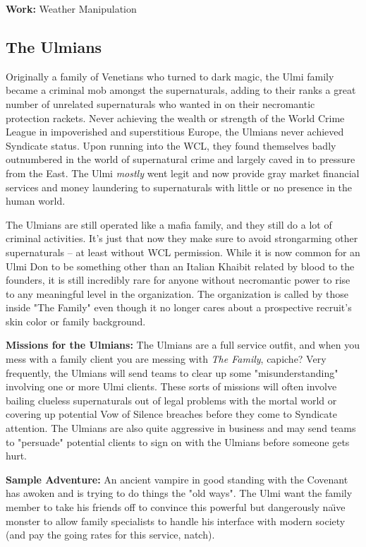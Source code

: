 \textbf{Work:} Weather Manipulation

\subsection{The Ulmians} 

Originally a family of Venetians who turned to dark magic, the Ulmi family became a criminal mob amongst the supernaturals, adding to their ranks a great number of unrelated supernaturals who wanted in on their necromantic protection rackets. Never achieving the wealth or strength of the World Crime League in impoverished and superstitious Europe, the Ulmians never achieved Syndicate status. Upon running into the WCL, they found themselves badly outnumbered in the world of supernatural crime and largely caved in to pressure from the East. The Ulmi \textit{mostly} went legit and now provide gray market financial services and money laundering to supernaturals with little or no presence in the human world.

The Ulmians are still operated like a mafia family, and they still do a lot of criminal activities. It's just that now they make sure to avoid strongarming other supernaturals -- at least without WCL permission. While it is now common for an Ulmi Don to be something other than an Italian Khaibit related by blood to the founders, it is still incredibly rare for anyone without necromantic power to rise to any meaningful level in the organization. The organization is called by those inside "The Family" even though it no longer cares about a prospective recruit's skin color or family background.

\textbf{Missions for the Ulmians:} The Ulmians are a full service outfit, and when you mess with a family client you are messing with \textit{The Family}, capiche? Very frequently, the Ulmians will send teams to clear up some "misunderstanding" involving one or more Ulmi clients. These sorts of missions will often involve bailing clueless supernaturals out of legal problems with the mortal world or covering up potential Vow of Silence breaches before they come to Syndicate attention. The Ulmians are also quite aggressive in business and may send teams to "persuade" potential clients to sign on with the Ulmians before someone gets hurt.

\textbf{Sample Adventure:} An ancient vampire in good standing with the Covenant has awoken and is trying to do things the "old ways". The Ulmi want the family member to take his friends off to convince this powerful but dangerously na\"{\i}ve monster to allow family specialists to handle his interface with modern society (and pay the going rates for this service, natch).

